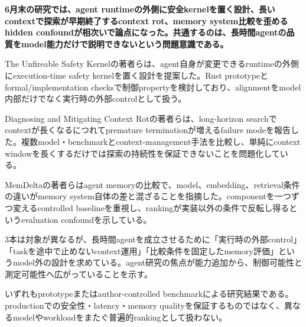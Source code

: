 \noindent\textbf{6月末の研究では、agent runtimeの外側に安全kernelを置く設計、長いcontextで探索が早期終了するcontext rot、memory system比較を歪めるhidden confoundが相次いで論点になった。共通するのは、長時間agentの品質をmodel能力だけで説明できないという問題意識である。}\autocite{src-246f07f416dc,src-644589094c65,src-8603fd60d637}

The Unfireable Safety Kernelの著者らは、agent自身が変更できるruntimeの外側にexecution-time safety kernelを置く設計を提案した。Rust prototypeとformal/implementation checksで制御propertyを検討しており、alignmentをmodel内部だけでなく実行時の外部controlとして扱う。\autocite{src-644589094c65}


Diagnosing and Mitigating Context Rotの著者らは、long-horizon searchでcontextが長くなるにつれてpremature terminationが増えるfailure modeを報告した。複数model・benchmarkとcontext-management手法を比較し、単純にcontext windowを長くするだけでは探索の持続性を保証できないことを問題化している。\autocite{src-8603fd60d637}


MemDeltaの著者らはagent memoryの比較で、model、embedding、retrieval条件の違いがmemory system自体の差と混ざることを指摘した。componentを一つずつ変えるcontrolled baselineを重視し、rankingが実装以外の条件で反転し得るというevaluation confoundを示している。\autocite{src-246f07f416dc}


3本は対象が異なるが、長時間agentを成立させるために「実行時の外部control」「taskを途中で止めないcontext運用」「比較条件を固定したmemory評価」というmodel外の設計を求めている。agent研究の焦点が能力追加から、制御可能性と測定可能性へ広がっていることを示す。\autocite{src-246f07f416dc,src-644589094c65,src-8603fd60d637}


\begin{claimboundary}
いずれもprototypeまたはauthor-controlled benchmarkによる研究結果である。productionでの安全性・latency・memory qualityを保証するものではなく、異なるmodelやworkloadをまたぐ普遍的rankingとして扱わない。\autocite{src-246f07f416dc,src-644589094c65,src-8603fd60d637}
\end{claimboundary}
